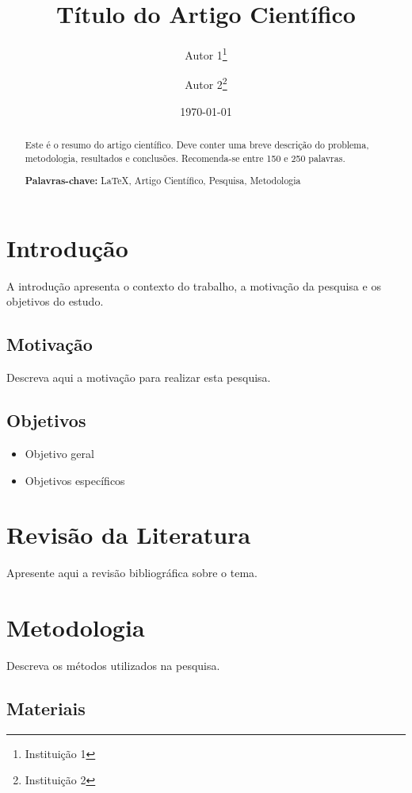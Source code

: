\documentclass[12pt,a4paper]{article}
\title{Título do Artigo Científico}
\author{Autor 1\thanks{Instituição 1} \and Autor 2\thanks{Instituição 2}}
\date{\today}
\begin{document}
\maketitle

\begin{abstract}
Este é o resumo do artigo científico. Deve conter uma breve descrição do problema, metodologia, resultados e conclusões. Recomenda-se entre 150 e 250 palavras.

\textbf{Palavras-chave:} LaTeX, Artigo Científico, Pesquisa, Metodologia
\end{abstract}

\section{Introdução}

A introdução apresenta o contexto do trabalho, a motivação da pesquisa e os objetivos do estudo.

\subsection{Motivação}

Descreva aqui a motivação para realizar esta pesquisa.

\subsection{Objetivos}

\begin{itemize}
  \item Objetivo geral
  \item Objetivos específicos
\end{itemize}

\section{Revisão da Literatura}

Apresente aqui a revisão bibliográfica sobre o tema.

\section{Metodologia}

Descreva os métodos utilizados na pesquisa.

\subsection{Materiais}
\end{document}

